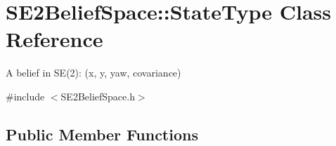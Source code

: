 \hypertarget{class_s_e2_belief_space_1_1_state_type}{\section{\-S\-E2\-Belief\-Space\-:\-:\-State\-Type \-Class \-Reference}
\label{class_s_e2_belief_space_1_1_state_type}
}


\-A belief in \-S\-E(2)\-: (x, y, yaw, covariance)  




{\ttfamily \#include $<$\-S\-E2\-Belief\-Space.\-h$>$}

\subsection*{\-Public \-Member \-Functions}
